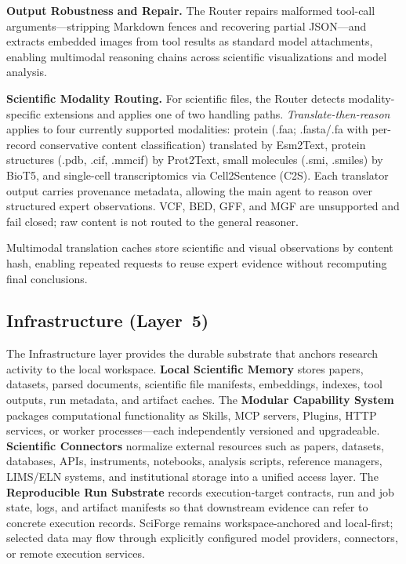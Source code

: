\documentclass[sn-basic,Numbered,pdflatex]{sn-jnl}
\begin{document}
\textbf{Output Robustness and Repair.} The Router repairs malformed tool-call arguments---stripping Markdown fences and recovering partial JSON---and extracts embedded images from tool results as standard model attachments, enabling multimodal reasoning chains across scientific visualizations and model analysis.

\textbf{Scientific Modality Routing.} For scientific files, the Router detects modality-specific extensions and applies one of two handling paths. \emph{Translate-then-reason} applies to four currently supported modalities: protein (.faa; .fasta/.fa with per-record conservative content classification) translated by Esm2Text, protein structures (.pdb, .cif, .mmcif) by Prot2Text, small molecules (.smi, .smiles) by BioT5, and single-cell transcriptomics via Cell2Sentence (C2S). Each translator output carries provenance metadata, allowing the main agent to reason over structured expert observations. VCF, BED, GFF, and MGF are unsupported and fail closed; raw content is not routed to the general reasoner.

Multimodal translation caches store scientific and visual observations by content hash, enabling repeated requests to reuse expert evidence without recomputing final conclusions.


\subsection{Infrastructure (Layer~5)}
The Infrastructure layer provides the durable substrate that anchors research activity to the local workspace. \textbf{Local Scientific Memory} stores papers, datasets, parsed documents, scientific file manifests, embeddings, indexes, tool outputs, run metadata, and artifact caches. The \textbf{Modular Capability System} packages computational functionality as Skills, MCP servers, Plugins, HTTP services, or worker processes---each independently versioned and upgradeable. \textbf{Scientific Connectors} normalize external resources such as papers, datasets, databases, APIs, instruments, notebooks, analysis scripts, reference managers, LIMS/ELN systems, and institutional storage into a unified access layer. The \textbf{Reproducible Run Substrate} records execution-target contracts, run and job state, logs, and artifact manifests so that downstream evidence can refer to concrete execution records. SciForge remains workspace-anchored and local-first; selected data may flow through explicitly configured model providers, connectors, or remote execution services.
\end{document}
